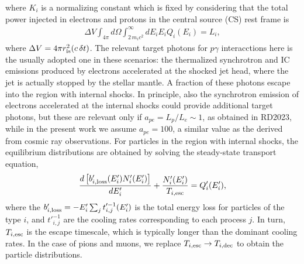 \documentclass[baaa]{baaa}
\newcommand{\be}{\begin{eqnarray}}
\newcommand{\ee}{\end{eqnarray}}
\begin{document}
where $K_i$ is a normalizing constant which is fixed by considering that the total power injected in electrons and protons in the central source (CS) rest frame {is}
\be
\Delta V \int_{4\pi}d\Omega \int_{2\,m_i c^2}^{\infty}dE_i E_iQ_i(E_i)= L_i, 
\ee
where $\Delta V=4\pi r_{\rm is}^2(c\,\delta t)$. {The relevant target photons for $p\gamma$ interacctions here is the usually adopted one in these scenarios: the thermalized synchrotron and IC emissions produced by electrons accelerated at the shocked jet head, where the jet is actually stopped by the stellar mantle. A fraction of these photons escape into the region with internal shocks. In principle, also the synchrotron emission of electrons accelerated at the internal shocks could provide additional target photons, but these are relevant only if $a_{pe}=L_p/L_e\sim 1$, as obtained in RD2023, while in the present work we assume $a_{pe}=100$, a similar value as the derived from cosmic ray observations.
%
For particles in the region with internal shocks,} the equilibrium distributions are obtained by solving the steady-state transport equation,
\be
\frac{d\left[b'_{i,\rm loss}(E'_i) N'_i(E'_i)\right]}{dE'_i}+  \frac{N'_i(E'_i)}{T_{i,\rm esc}}= Q'_i(E'_i),\label{Eq_transport_i}  
\ee
where the $b'_{i,\rm loss}=- E'_i \sum_j t'^{-1}_{i,j}(E'_{i})$ is the total energy loss for particles of the type $i$, and $t'^{-1}_{i,j}$ are the cooling rates corresponding to each process $j$. In turn, $T_{i,\rm esc}$ is the escape timescale, which is typically longer than the dominant cooling rates. In the case of pions and muons, we replace $T_{i,\rm esc}\rightarrow T_{i,\rm dec}$ to obtain the particle distributions. 
%
\end{document}
